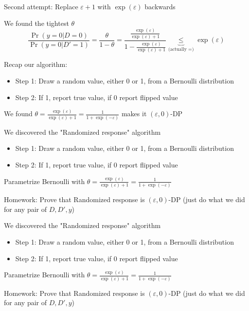 \documentclass[12pt,aspectratio=169,handout]{beamer}
\begin{document}
\begin{frame}{Second attempt: Replace $\varepsilon + 1$ with $\exp(\varepsilon)$ backwards}

\begin{block}{We found the tightest $\theta$}
$$
\frac{\Pr(y = 0 | D = 0)}{\Pr(y = 0 | D' = 1)} =
\frac{\theta}{1 - \theta} =
\frac{
\frac{ \exp(\varepsilon)}{ \exp(\varepsilon) + 1}
}{
	1 - \frac{ \exp(\varepsilon)}{ \exp(\varepsilon) + 1}
}
\underbrace{\leq}_{\text{(actually } = \text{)}}
\exp(\varepsilon)
$$
\end{block}


Recap our algorithm:

\begin{itemize}
\item Step 1: Draw a random value, either 0 or 1, from a Bernoulli distribution
\item Step 2: If 1, report true value, if 0 report flipped value
\end{itemize}

We found $\theta = \frac{\exp(\varepsilon)}{\exp(\varepsilon) + 1} = \frac{1}{1 + \exp(- \varepsilon)}$ makes it $(\varepsilon, 0)$-DP


\end{frame}


\begin{frame}{We discovered the "Randomized response" algorithm}

\begin{itemize}
\item Step 1: Draw a random value, either 0 or 1, from a Bernoulli distribution
\item Step 2: If 1, report true value, if 0 report flipped value
\end{itemize}

Parametrize Bernoulli with $\theta = \frac{\exp(\varepsilon)}{\exp(\varepsilon) + 1} = \frac{1}{1 + \exp(- \varepsilon)}$

Homework: Prove that Randomized response is $(\varepsilon, 0)$-DP (just do what we did for any pair of $D, D', y$)


\end{frame}





\begin{frame}{We discovered the "Randomized response" algorithm}

\begin{itemize}
\item Step 1: Draw a random value, either 0 or 1, from a Bernoulli distribution
\item Step 2: If 1, report true value, if 0 report flipped value
\end{itemize}

Parametrize Bernoulli with $\theta = \frac{\exp(\varepsilon)}{\exp(\varepsilon) + 1} = \frac{1}{1 + \exp(- \varepsilon)}$

Homework: Prove that Randomized response is $(\varepsilon, 0)$-DP (just do what we did for any pair of $D, D', y$)


\end{frame}
\end{document}
